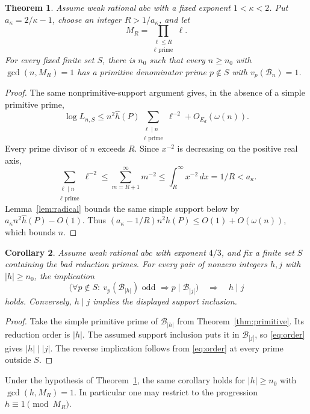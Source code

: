 \documentclass[11pt,a4paper]{article}
\newtheorem{theorem}{Theorem}[section]
\newtheorem{corollary}[theorem]{Corollary}
\begin{document}
\begin{theorem}\label{thm:coprime}
Assume weak rational $abc$ with a fixed exponent
$1<\kappa<2$. Put $a_\kappa=2/\kappa-1$, choose an integer
$R>1/a_\kappa$, and let
\[
                  M_R=\prod_{\substack{\ell\le R\\\ell\text{ prime}}}\ell.
\]
For every fixed finite set $S$, there is $n_0$ such that every
$n\ge n_0$ with $\gcd(n,M_R)=1$ has a primitive denominator
prime $p\notin S$ with $v_p(\mathcal B_n)=1$.
\end{theorem}
\begin{proof}
The same nonprimitive-support argument gives, in the absence
of a simple primitive prime,
\[
 \log L_{n,S}\le n^2\widehat h(P)
                  \sum_{\substack{\ell\mid n\\\ell\text{ prime}}}\ell^{-2}
                  +O_{E_d}(\omega(n)).
\]
Every prime divisor of $n$ exceeds $R$. Since $x^{-2}$ is
decreasing on the positive real axis,
\[
 \sum_{\substack{\ell\mid n\\\ell\text{ prime}}}\ell^{-2}
     \le\sum_{m=R+1}^{\infty}m^{-2}
     \le\int_R^\infty x^{-2}\,dx
     =1/R<a_\kappa.
\]
Lemma~\ref{lem:radical} bounds the same simple support below
by $a_\kappa n^2\widehat h(P)-O(1)$.
Thus $(a_\kappa-1/R)n^2\widehat h(P)\le O(1)+O(\omega(n))$,
which bounds $n$.
\end{proof}

\begin{corollary}\label{cor:divides}
Assume weak rational $abc$ with exponent $4/3$, and fix a finite
set $S$ containing the bad reduction primes.
For every pair of nonzero integers $h,j$ with
$|h|\ge n_0$, the implication
\[
 \bigl(\forall p\notin S:\ v_p(\mathcal B_{|h|})\text{ odd }
                                      \Longrightarrow p\mid \mathcal B_{|j|}\bigr)
                          \quad\Longrightarrow\quad h\mid j
\]
holds. Conversely, $h\mid j$ implies the displayed support inclusion.
\end{corollary}
\begin{proof}
Take the simple primitive prime of $\mathcal B_{|h|}$ from
Theorem~\ref{thm:primitive}. Its reduction order is $|h|$.
The assumed support inclusion puts it in $\mathcal B_{|j|}$, so
\eqref{eq:order} gives $|h|\mid |j|$. The reverse implication
follows from \eqref{eq:order} at every prime outside $S$.
\end{proof}

Under the hypothesis of Theorem~\ref{thm:coprime}, the same
corollary holds for $|h|\ge n_0$ with $\gcd(h,M_R)=1$.
In particular one may restrict to the progression
$h\equiv1\pmod{M_R}$.
\end{document}
